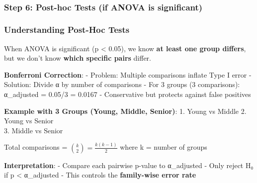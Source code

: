 \documentclass[11pt]{article}
\begin{document}
    \begin{center}
    \end{center}
    { \hspace*{\fill} \\}
    
    \subsubsection{Step 6: Post-hoc Tests (if ANOVA is
significant)}\label{step-6-post-hoc-tests-if-anova-is-significant}

    \subsubsection{Understanding Post-Hoc
Tests}\label{understanding-post-hoc-tests}

When ANOVA is significant (p \textless{} 0.05), we know \textbf{at least
one group differs}, but we don't know \textbf{which specific pairs}
differ.

\textbf{Bonferroni Correction}: - Problem: Multiple comparisons inflate
Type I error - Solution: Divide α by number of comparisons - For 3
groups (3 comparisons): α\_adjusted = 0.05/3 = 0.0167 - Conservative but
protects against false positives

\textbf{Example with 3 Groups (Young, Middle, Senior)}: 1. Young vs
Middle 2. Young vs Senior\\
3. Middle vs Senior

Total comparisons = \(\binom{k}{2} = \frac{k(k-1)}{2}\) where k = number
of groups

\textbf{Interpretation}: - Compare each pairwise p-value to α\_adjusted
- Only reject H₀ if p \textless{} α\_adjusted - This controls the
\textbf{family-wise error rate}
\end{document}
